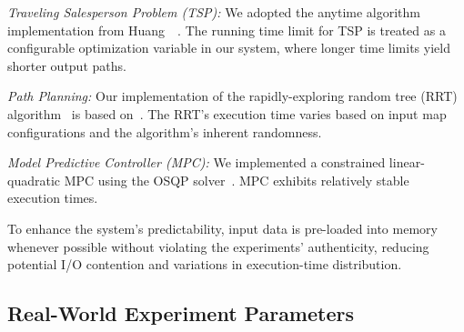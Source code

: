     \textit{Traveling Salesperson Problem (TSP):}
    We adopted the anytime algorithm implementation from Huang~\etal~\cite{Huang23ICRA_TSP}.
    The running time limit for TSP is treated as a configurable optimization variable in our system, where longer time limits yield shorter output paths.

    \textit{Path Planning:}
    Our implementation of the rapidly-exploring random tree (RRT) algorithm~\cite{LaValle1998RapidlyexploringRT} is based on~\cite{rrt_github}.
    The RRT's execution time varies based on input map configurations and the algorithm's inherent randomness.

    \textit{Model Predictive Controller (MPC):}
    We implemented a constrained linear-quadratic MPC using the OSQP solver~\cite{stellato18OSQP}.
    MPC exhibits relatively stable execution times.

	To enhance the system's predictability, input data is pre-loaded into memory whenever possible without violating the experiments' authenticity, reducing potential I/O contention and variations in execution-time distribution.
	
	\subsection{Real-World Experiment Parameters}
        


